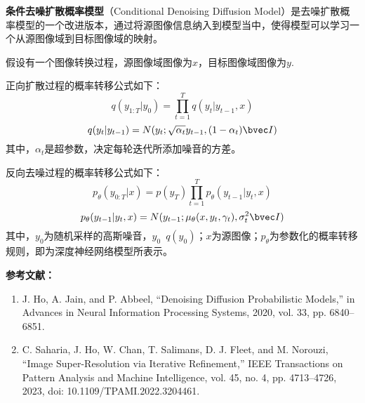 
\textbf{条件去噪扩散概率模型}（Conditional Denoising Diffusion Model）是去噪扩散概率模型的一个改进版本，通过将源图像信息纳入到模型当中，使得模型可以学习一个从源图像域到目标图像域的映射。

假设有一个图像转换过程，源图像域图像为$x$，目标图像域图像为$y$.

正向扩散过程的概率转移公式如下：
\begin{equation}
q({y_{1:T}}|{y_0}) = \prod\limits_{t = 1}^T {q({y_t}|{y_{t - 1},x})}
\end{equation}
\begin{equation}
q({y_t}|{y_{t - 1}}) = {N}({y_t};\sqrt {\alpha_t} {y_{t - 1}},(1-\alpha_t) \bvec I)
\end{equation}
其中，$\alpha_t$是超参数，决定每轮迭代所添加噪音的方差。

反向去噪过程的概率转移公式如下：
\begin{equation}
{p_\theta }({y_{0:T}|x}) = p({y_T})\prod\limits_{t = 1}^T {{p_\theta }({y_{t - 1}}|{y_t,x})}
\end{equation}
\begin{equation}
{p_\theta }({y_{t - 1}}|{y_t,x}) = N({y_{t - 1}};{\mu _\theta }({x,y_t,\gamma_t}),\sigma_t^2 \bvec I)
\end{equation}
其中，$y_0$为随机采样的高斯噪音，$y_0$~$q(y_0)$；$x$为源图像；$p_\theta$为参数化的概率转移规则，即为深度神经网络模型所表示。


\textbf{参考文献：}
\begin{enumerate}
\item J. Ho, A. Jain, and P. Abbeel, “Denoising Diffusion Probabilistic Models,” in Advances in Neural Information Processing Systems, 2020, vol. 33, pp. 6840–6851.
\item C. Saharia, J. Ho, W. Chan, T. Salimans, D. J. Fleet, and M. Norouzi, “Image Super-Resolution via Iterative Refinement,” IEEE Transactions on Pattern Analysis and Machine Intelligence, vol. 45, no. 4, pp. 4713–4726, 2023, doi: 10.1109/TPAMI.2022.3204461.
\end{enumerate}